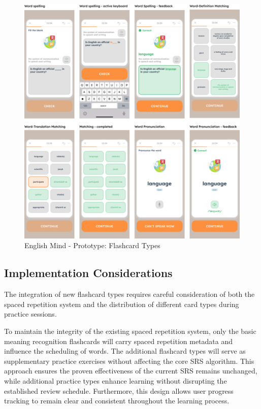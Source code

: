 \begin{figure}[!h]
    \includegraphics[width=1\textwidth]{src/figures/em-prototype-flashcards.png}
    \caption{English Mind - Prototype: Flashcard Types}
    \label{fig:em-prototype-flashcard-types}
\end{figure}

\subsection*{Implementation Considerations}

The integration of new flashcard types requires careful consideration of both the spaced repetition system and the distribution of different card types during practice sessions.

To maintain the integrity of the existing spaced repetition system, only the basic meaning recognition flashcards will carry spaced repetition metadata and influence the scheduling of words. The additional flashcard types will serve as supplementary practice exercises without affecting the core SRS algorithm. This approach ensures the proven effectiveness of the current SRS remains unchanged, while additional practice types enhance learning without disrupting the established review schedule. Furthermore, this design allows user progress tracking to remain clear and consistent throughout the learning process.

